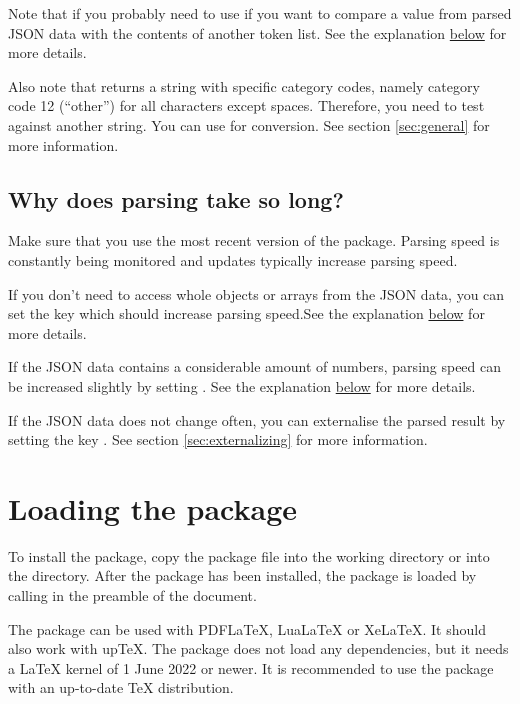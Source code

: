 \documentclass[a4paper]{article}
\begin{document}
Note that if you probably need to use \macro{\JSONParseExpandableValue} if you want to compare a value from parsed JSON data with the contents of another token list. See the explanation \hyperlink{macro:expandablevalue}{below} for more details.

Also note that \macro{\JSONParseExpandableValue} returns a string with specific category codes, namely category code 12 (``other'') for all characters except spaces. Therefore, you need to test against another string. You can use \macro{\detokenize} for conversion. See section \ref{sec:general} for more information.

\subsection{Why does parsing take so long?}

Make sure that you use the most recent version of the package. Parsing speed is constantly being monitored and updates typically increase parsing speed.

If you don't need to access whole objects or arrays from the JSON data, you can set the key  which should increase parsing speed.See the explanation \hyperlink{key:skipstructures}{below} for more details.

If the JSON data contains a considerable amount of numbers, parsing speed can be increased slightly by setting . See the explanation \hyperlink{key:validatenumbers}{below} for more details.

If the JSON data does not change often, you can externalise the parsed result by setting the key . See section \ref{sec:externalizing} for more information.

\section{Loading the package}

To install the package, copy the package file  into the working directory or into the  directory. After the package has been installed, the  package is loaded by calling \macro{\usepackage{jsonparse}} in the preamble of the document.

The package can be used with PDFLaTeX, LuaLaTeX or XeLaTeX. It should also work with upTeX. The package does not load any dependencies, but it needs a LaTeX kernel of 1 June 2022 or newer. It is recommended to use the package with an up-to-date TeX distribution.
\end{document}
